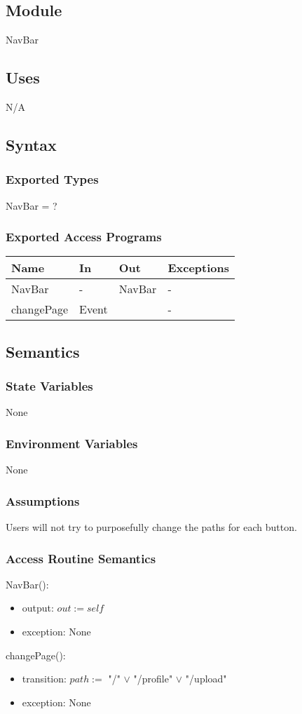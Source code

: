\documentclass[12pt, titlepage]{article}
\begin{document}
\subsection{Module}
NavBar
\subsection{Uses}
N/A
\subsection{Syntax}
\subsubsection{Exported Types}
NavBar = ?
\subsubsection{Exported Access Programs}
\begin{center}
	\begin{tabular}{p{3cm} p{4cm} p{4cm} p{3cm}}
		\hline
		\textbf{Name} & \textbf{In} & \textbf{Out} & \textbf{Exceptions} \\
		\hline
		NavBar & - & NavBar & - \\
		changePage & Event &  & - \\
		\hline
	\end{tabular}
\end{center}
\subsection{Semantics}
\subsubsection{State Variables}
None
\subsubsection{Environment Variables}
None
\subsubsection{Assumptions}
Users will not try to purposefully change the paths for each button.
\subsubsection{Access Routine Semantics}
\noindent NavBar():
\begin{itemize}
	\item output: $out := self$ 
	\item exception: None
\end{itemize}
\noindent changePage():
\begin{itemize}
	\item transition: $path :=$ "/" $\lor$ "/profile" $\lor$ "/upload" 
	\item exception: None
\end{itemize}
\end{document}
